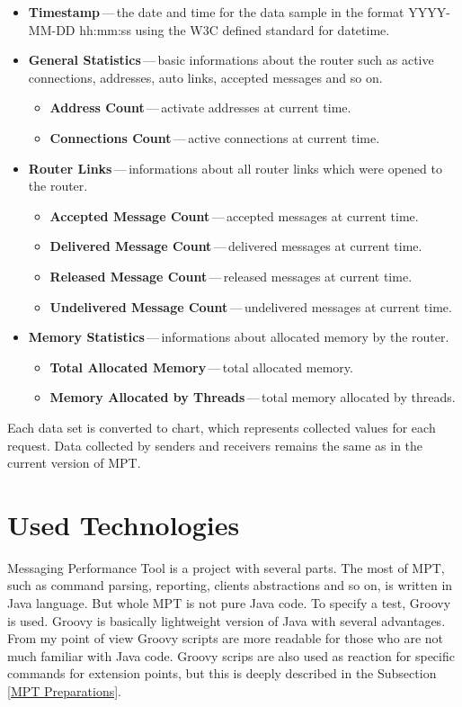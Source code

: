 \begin{itemize}
	\setlength\itemsep{0em}
	\item \textbf{Timestamp}\,---\,the date and time for the data sample in the format YYYY-MM-DD hh:mm:ss using the W3C defined standard for datetime.
	\item \textbf{General Statistics}\,---\,basic informations about the router such as active connections, addresses, auto links, accepted messages and so on.
	\begin{itemize}
		\setlength\itemsep{0em}
		\item \textbf{Address Count}\,---\,activate addresses at current time.
		\item \textbf{Connections Count}\,---\,active connections at current time.
	\end{itemize}
	\item \textbf{Router Links}\,---\,informations about all router links which were opened to the router.
	\begin{itemize}
		\setlength\itemsep{0em}
		\item \textbf{Accepted Message Count}\,---\,accepted messages at current time.
		\item \textbf{Delivered Message Count}\,---\,delivered messages at current time.
		\item \textbf{Released Message Count}\,---\,released messages at current time.
		\item \textbf{Undelivered Message Count}\,---\,undelivered messages at current time.
	\end{itemize}
	\item \textbf{Memory Statistics}\,---\,informations about allocated memory by the router.
	\begin{itemize}
		\setlength\itemsep{0em}
		\item \textbf{Total Allocated Memory}\,---\,total allocated memory.
		\item \textbf{Memory Allocated by Threads}\,---\,total memory allocated by threads.
	\end{itemize}
\end{itemize}

Each data set is converted to chart, which represents collected values for each request. Data collected by senders and receivers remains the same as in the current version of MPT.

\section{Used Technologies}
Messaging Performance Tool is a project with several parts. The most of MPT, such as command parsing, reporting, clients abstractions and so on, is written in Java language. But whole MPT is not pure Java code. To specify a test, Groovy is used. Groovy is basically lightweight version of Java with several advantages. From my point of view Groovy scripts are more readable for those who are not much familiar with Java code. Groovy scrips are also used as reaction for specific commands for extension points, but this is deeply described in the Subsection \ref{MPT Preparations}.

